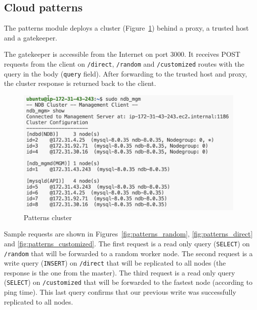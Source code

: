 \documentclass[letterpaper,headings=standardclasses,parskip=half]{scrartcl}
\begin{document}
\clearpage
\subsection{Cloud patterns}

The patterns module deploys a cluster (Figure~\ref{fig:patterns_cluster}) behind a proxy, a trusted host and a gatekeeper.

The gatekeeper is accessible from the Internet on port 3000. It receives POST requests from the client on \texttt{/direct}, \texttt{/random} and \texttt{/customized} routes with the query in the body (\texttt{query} field). After forwarding to the trusted host and proxy, the cluster response is returned back to the client.

\begin{figure}[h]
    \centering
    \includegraphics[width=0.75\linewidth]{figures/Screenshot 2023-12-25 at 23.18.08.png}
    \caption{Patterns cluster}
    \label{fig:patterns_cluster}
\end{figure}

Sample requests are shown in Figures~\ref{fig:patterns_random}, \ref{fig:patterns_direct} and \ref{fig:patterns_customized}. The first request is a read only query (\texttt{SELECT}) on \texttt{/random} that will be forwarded to a random worker node. The second request is a write query (\texttt{INSERT}) on \texttt{/direct} that will be replicated to all nodes (the response is the one from the master). The third request is a read only query (\texttt{SELECT}) on \texttt{/customized} that will be forwarded to the fastest node (according to ping time). This last query confirms that our previous write was successfully replicated to all nodes.
\end{document}
